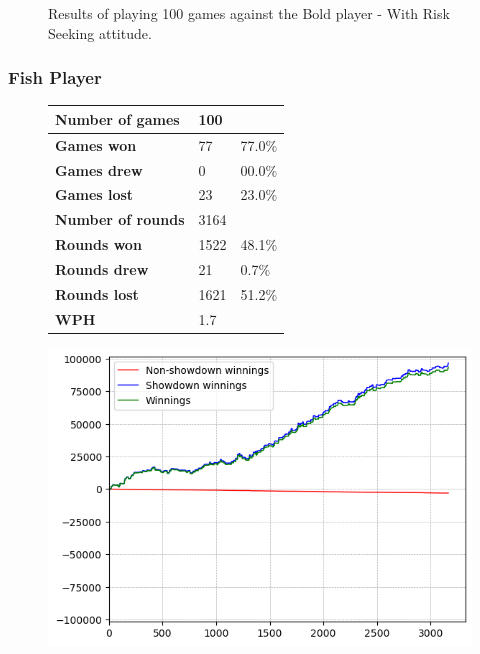 \begin{figure}[H]
\begin{minipage}{\textwidth}
\begin{minipage}{0.5\textwidth}
        \end{minipage}
    \end{minipage}
    \caption{Results of playing 100 games against the Bold player - With Risk Seeking attitude.}
    \label{fig:results_seeking_bold}
\end{figure}

\subsubsection{Fish Player}
\begin{figure}[H]
    \centering
    \begin{minipage}{\textwidth}
        \begin{minipage}{0.40\textwidth}
            \begin{tabular}{|l|l|l|}
                \hline
                \textbf{Number of games}  & 100   &        \\ \hline
                \textbf{Games won}        & 77    & 77.0\% \\ \hline
                \textbf{Games drew}       & 0     & 00.0\%  \\ \hline
                \textbf{Games lost}       & 23    & 23.0\% \\ \hline
                \textbf{Number of rounds} & 3164  &        \\ \hline
                \textbf{Rounds won}       & 1522   & 48.1\%  \\ \hline
                \textbf{Rounds drew}      & 21     & 0.7\%  \\ \hline
                \textbf{Rounds lost}      & 1621  & 51.2\% \\ \hline
                \textbf{WPH}              & 1.7 &        \\ \hline
            \end{tabular}
        \end{minipage}
        \hspace{0.05\textwidth}
        \begin{minipage}{0.5\textwidth}
            \includegraphics[width=\textwidth]{graphics/risk-seeking/fish.png}

\end{minipage}
\end{minipage}
\end{figure}
